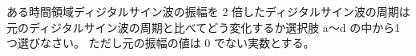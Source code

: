ある時間領域ディジタルサイン波の振幅を $2$ 倍したディジタルサイン波の周期は元のディジタルサイン波の周期と比べてどう変化するか選択肢 a〜d の中から1つ選びなさい。
ただし元の振幅の値は $0$ でない実数とする。

